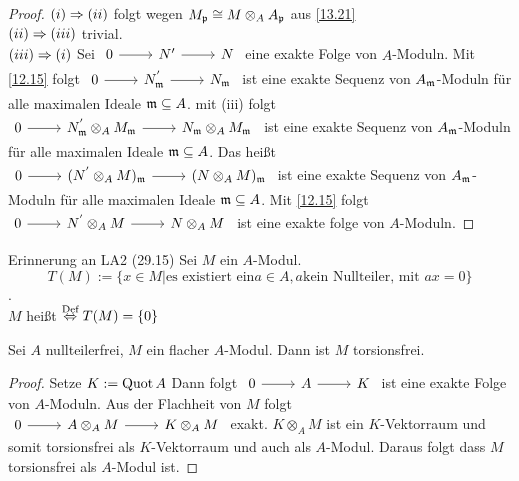\begin{proof}
	$(i) \Rightarrow(ii) $ folgt wegen $M_{\mathfrak{p}} \cong M \otimes_A A_{\mathfrak{p}} $ aus \ref{13.21} \\
	$(ii) \Rightarrow(iii) $ trivial.\\
	$(iii) \Rightarrow(i) $ Sei $\begin{tikzcd} 0 \arrow{r} & N' \arrow{r} & N \end{tikzcd}$ eine exakte Folge von $A$-Moduln. Mit \ref{12.15} folgt  $\begin{tikzcd} 0 \arrow{r} & N_{\m}^{'} \arrow{r} & N_{\m} \end{tikzcd}$ ist eine exakte Sequenz von $A_{\mathfrak{m}}$-Moduln für alle maximalen Ideale $\mathfrak{m} \subseteq A $. mit (iii) folgt  $\begin{tikzcd} 0 \arrow{r} & N_{\m}^{'} \otimes_A M_{\m} \arrow{r} & N_{\m} \otimes_A M_{\m} \end{tikzcd}$
	ist eine exakte Sequenz von $A_{\mathfrak{m}}$-Moduln für alle maximalen Ideale $\mathfrak{m} \subseteq A $. Das heißt $\begin{tikzcd} 0 \arrow{r} & (N^{'} \otimes_A M)_{\m} \arrow{r} & ( N \otimes_A M)_{\m} \end{tikzcd}$ ist eine exakte Sequenz von $A_{\mathfrak{m}}$-Moduln für alle maximalen Ideale $\mathfrak{m} \subseteq A $. Mit \ref{12.15} folgt  $\begin{tikzcd} 0 \arrow{r} & N^{'} \otimes_A M \arrow{r} & N \otimes_A M \end{tikzcd}$ ist eine exakte folge von $A$-Moduln. 
\end{proof}
\begin{anm}
	Erinnerung an LA2 (29.15) Sei $M$ ein $A$-Modul. $$ T(M) := \{ x \in M | \text{es existiert ein} a \in A, a \text{kein Nullteiler, mit } ax = 0 \} $$ . \\
	$M$ heißt  $\overset{\text{Def}}{\Leftrightarrow} T(M) = \{0\}$
\end{anm}
\begin{bem} \label{13.24}
	Sei $A$ nullteilerfrei, $M$ ein flacher $A$-Modul. Dann ist $M$ torsionsfrei. 
\end{bem}
\begin{proof}
	Setze $K := \operatorname{Quot} A$ Dann folgt $\begin{tikzcd} 0 \arrow{r} & A \arrow{r} & K \end{tikzcd}$ ist eine exakte Folge von $A$-Moduln. Aus der Flachheit von $M$ folgt $\begin{tikzcd} 0 \arrow{r} & A  \otimes_A M \arrow{r} & K \otimes_A M \end{tikzcd}$ exakt. $K \otimes_A M $ ist ein $K$-Vektorraum und somit torsionsfrei als $K$-Vektorraum und auch als $A$-Modul. Daraus folgt dass $M$ torsionsfrei als $A$-Modul ist.
\end{proof}
